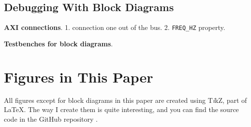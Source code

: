 \documentclass[journal,twoside]{IEEEtran}
\begin{document}
    \subsection{Debugging With Block Diagrams}

      \textbf{AXI connections}.
      1. connection one out of the bus.
      2. \texttt{FREQ\_HZ} property.

      \textbf{Testbenches for block diagrams}.


  \section{Figures in This Paper}

    All figures except for block diagrams in this paper
    are created using T\textit{i}kZ, part of \LaTeX{}.
    The way I create them is quite interesting,
    and you can find the source code in the GitHub repository \cite{github_repo}.

  
  
\end{document}
